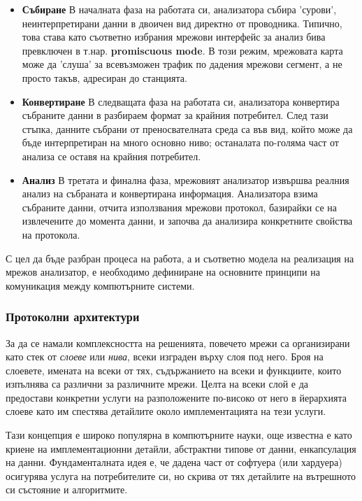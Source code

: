 \documentclass[12pt,a4paper,oneside]{book}
\begin{document}
\begin{itemize}
  \item
    \textbf{Събиране} В началната фаза на работата си, анализатора събира
    'сурови', неинтерпретирани данни в двоичен вид директно от проводника.
    Типично, това става като съответно избрания мрежови интерфейс за анализ
    бива превключен в т.нар.  \textbf{promiscuous mode}. В този режим, мрежовата карта
    може да 'слуша' за всевъзможен трафик по дадения мрежови сегмент, а не
    просто такъв, адресиран до станцията.
  \item
    \textbf{Конвертиране} В следващата фаза на работата си, анализатора
    конвертира събраните данни в разбираем формат за крайния потребител. След тази
    стъпка, данните събрани от преносвателната среда са във вид, който може да
    бъде интерпретиран на много основно ниво; останалата по-голяма част от
    анализа се оставя на крайния потребител.
  \item
    \textbf{Анализ} В третата и финална фаза, мрежовият анализатор извършва
    реалния анализ на събраната и конвертирана информация. Анализатора взима
    събраните данни, отчита използвания мрежови протокол, базирайки се на
    извлечените до момента данни, и започва да анализира конкретните свойства на
    протокола.
\end{itemize}

С цел да бъде разбран процеса на работа, а и съответно модела на реализация на
мрежов анализатор, е необходимо дефиниране на основните принципи на
комуникация между компютърните системи.

\subsubsection{Протоколни архитектури}

За да се намали комплексността на решенията, повечето мрежи са организирани като
стек от \textit{слоеве} или \textit{нива}, всеки изграден върху слоя под него.
Броя на слоевете, имената на всеки от тях, съдържанието на всеки и функциите,
които изпълнява са различни за различните мрежи. Целта на всеки слой е да
предостави конкретни услуги на разположените по-високо от него в йерархията
слоеве като им спестява детайлите около имплементацията на тези услуги.

Тази концепция е широко популярна в компютърните науки, още известна е като
криене на имплементационни детайли, абстрактни типове от данни, енкапсулация на
данни. Фундаменталната идея е, че дадена част от софтуера (или хардуера)
осигурява услуга на потребителите си, но скрива от тях детайлите на вътрешното
си състояние и алгоритмите.
\end{document}
